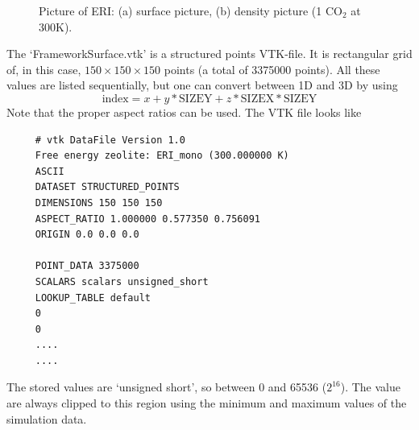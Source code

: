 \begin{figure}[t]
  \centering
  \caption{Picture of ERI: (a) surface picture, (b) density picture (1 CO$_2$ at 300K).}
  \label{Fig: ERI density}
\end{figure}

The `FrameworkSurface.vtk' is a structured points VTK-file. It is rectangular grid of, in this case,
$150\times150\times150$ points (a total of 3375000 points). All these values are listed sequentially,
but one can convert between 1D and 3D by using 
\begin{equation}
\text{index}=x+y*\text{SIZEY}+z*\text{SIZEX}*\text{SIZEY}
\end{equation}
Note that the proper aspect ratios can be used. The VTK file looks like
\begin{verbatim}
     # vtk DataFile Version 1.0
     Free energy zeolite: ERI_mono (300.000000 K)
     ASCII
     DATASET STRUCTURED_POINTS
     DIMENSIONS 150 150 150
     ASPECT_RATIO 1.000000 0.577350 0.756091
     ORIGIN 0.0 0.0 0.0

     POINT_DATA 3375000
     SCALARS scalars unsigned_short
     LOOKUP_TABLE default
     0
     0
     ....
     ....
\end{verbatim}
The stored values are `unsigned short', so between 0 and 65536 ($2^{16}$). The value are always clipped to this region
using the minimum and maximum values of the simulation data.


